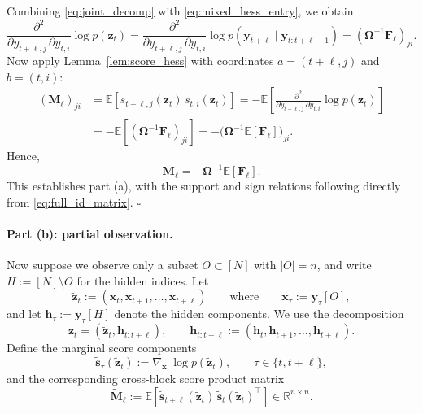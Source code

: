 \documentclass{article}
\theoremstyle{plain}
\theoremstyle{definition}
\theoremstyle{remark}
\newcommand{\R}{\mathbb{R}}
\newcommand{\E}{\mathbb{E}}
\newcommand{\1}{\mathbf{1}}
\newcommand{\x}{\bm{x}}
\newcommand{\y}{\bm{y}}
\newcommand{\z}{\bm{z}}
\newcommand{\h}{\bm{h}}
\newcommand{\s}{\bm{s}}
\begin{document}
Combining \eqref{eq:joint_decomp} with \eqref{eq:mixed_hess_entry}, we obtain
$$
\frac{\partial^2}{\partial y_{t+\ell,j}\,\partial y_{t,i}}
\log p(\z_t)
=
\frac{\partial^2}{\partial y_{t+\ell,j}\,\partial y_{t,i}}
\log p(\y_{t+\ell}\mid \y_{t:t+\ell-1})
=
(\bm{\Omega}^{-1}\bm{F}_\ell)_{j i}.
$$
Now apply Lemma~\ref{lem:score_hess} with coordinates $a=(t+\ell,j)$ and $b=(t,i)$:
\begin{align}
(\bm{M}_\ell)_{j i}
&=
\E\!\left[s_{t+\ell,j}(\z_t)\, s_{t,i}(\z_t)\right]
=
-\E\!\left[
\frac{\partial^2}{\partial y_{t+\ell,j}\,\partial y_{t,i}}
\log p(\z_t)
\right]
\nonumber\\
&=
-\E\!\left[(\bm{\Omega}^{-1}\bm{F}_\ell)_{j i}\right]
=
-\bigl(\bm{\Omega}^{-1}\E[\bm{F}_\ell]\bigr)_{j i}.
\label{eq:full_id_correct}
\end{align}
Hence,
\begin{equation}
\bm{M}_\ell
=
-\bm{\Omega}^{-1}\E[\bm{F}_\ell].
\label{eq:full_id_matrix}
\end{equation}
This establishes part (a), with the support and sign relations following directly from \eqref{eq:full_id_matrix}. \hfill $\square$

\paragraph{Part (b): partial observation.}
Now suppose we observe only a subset $O\subset[N]$ with $|O|=n$, and write $H:=[N]\setminus O$ for the hidden indices. Let
$$
\tilde{\z}_t := (\x_t,\x_{t+1},\ldots,\x_{t+\ell})
\qquad\text{where}\qquad
\x_\tau := \y_\tau[O],
$$
and let $\h_\tau := \y_\tau[H]$ denote the hidden components. We use the decomposition
$$
\z_t = (\tilde{\z}_t, \h_{t:t+\ell}),
\qquad
\h_{t:t+\ell} := (\h_t,\h_{t+1},\ldots,\h_{t+\ell}).
$$
Define the marginal score components
$$
\tilde{\s}_\tau(\tilde{\z}_t) := \nabla_{\x_\tau} \log p(\tilde{\z}_t),
\qquad \tau\in\{t,t+\ell\},
$$
and the corresponding cross-block score product matrix
$$
\tilde{\bm{M}}_\ell := \E\!\left[\tilde{\s}_{t+\ell}(\tilde{\z}_t)\,\tilde{\s}_t(\tilde{\z}_t)^\top\right]\in\R^{n\times n}.
$$
\end{document}
